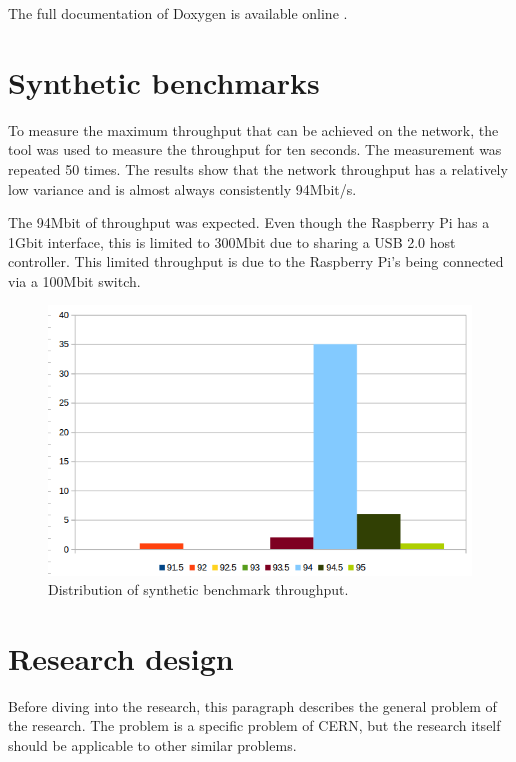 \documentclass[]{article}
\begin{document}
The full documentation of Doxygen is available online \cite{doxygen}.

\section{Synthetic benchmarks}
To measure the maximum throughput that can be achieved on the network, the \cite{iperf3} tool was used to measure the throughput for ten seconds. The measurement was repeated 50 times. The results show that the network throughput has a relatively low variance and is almost always consistently 94Mbit/s.

The 94Mbit of throughput was expected. Even though the Raspberry Pi has a 1Gbit interface, this is limited to 300Mbit due to sharing a USB 2.0 host controller. This limited throughput is due to the Raspberry Pi’s being connected via a 100Mbit switch.

\begin{center}
	\begin{figure}[H]
		\includegraphics[width=\textwidth]{images/network-benchmark}
		\caption{Distribution of synthetic benchmark throughput.}
		\label{fig:ssh}
	\end{figure}
\end{center}

\section{Research design}
Before diving into the research, this paragraph describes the general problem of the research. The problem is a specific problem of CERN, but the research itself should be applicable to other similar problems.
\end{document}
